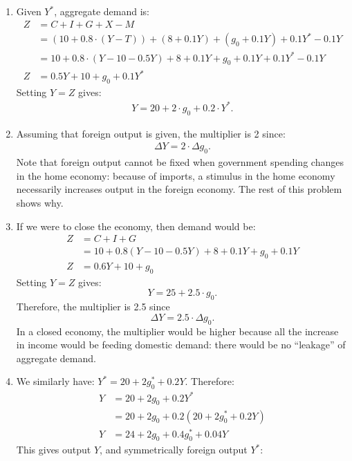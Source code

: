\documentclass[]{book}
\begin{document}
\begin{enumerate}
\def\labelenumi{\arabic{enumi}.}
\item
  Given \(Y^{*}\), aggregate demand is: \[
  \begin{aligned}
  Z   &=C+I+G+X-M\\
  &=\left(10+0.8 \cdot (Y-T)\right)+\left(8+0.1Y\right) + \left(g_0+0.1Y\right) + 0.1Y^{*} - 0.1Y\\
  &=10+0.8 \cdot (Y-10-0.5Y)+8+0.1Y + g_0+0.1Y + 0.1Y^{*} - 0.1Y\\
  Z &= 0.5Y + 10 + g_0+ 0.1Y^{*}
  \end{aligned}
  \] Setting \(Y=Z\) gives: \[
  \begin{aligned}
  \boxed{Y=20+2 \cdot g_0+ 0.2 \cdot Y^{*}}.
  \end{aligned}
  \]
\item
  Assuming that foreign output is given, the multiplier is 2 since: \[
  \begin{aligned}
  \boxed{\Delta Y=2 \cdot \Delta g_0}.
  \end{aligned}
  \] Note that foreign output cannot be fixed when government spending
  changes in the home economy: because of imports, a stimulus in the
  home economy necessarily increases output in the foreign economy. The
  rest of this problem shows why.
\item
  If we were to close the economy, then demand would be: \[
  \begin{aligned}
  Z   &=C+I+G\\
  &=10+0.8(Y-10-0.5Y)+8+0.1Y + g_0+0.1Y\\
  Z &= 0.6Y + 10 + g_0
  \end{aligned}
  \] Setting \(Y=Z\) gives: \[\boxed{Y= 25 + 2.5  \cdot g_0}.\]
  Therefore, the multiplier is 2.5 since
  \[\boxed{\Delta Y=2.5  \cdot \Delta g_0}.\] In a closed economy, the
  multiplier would be higher because all the increase in income would be
  feeding domestic demand: there would be no ``leakage'' of aggregate
  demand.
\item
  We similarly have: \(Y^{*}=20+2g_0^{*}+ 0.2Y.\) Therefore: \[
  \begin{aligned}
  Y&=20+2g_0+ 0.2Y^{*}\\
  &=20+2g_0+ 0.2\left(20+2g_0^{*}+ 0.2Y\right)\\
  Y&=24+2g_0+0.4g_0^{*}+0.04Y
  \end{aligned}
  \] This gives output \(Y\), and symmetrically foreign output
  \(Y^{*}\): \[
  \begin{aligned}

\end{aligned}\]
\end{enumerate}
\end{document}
